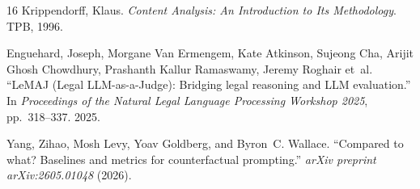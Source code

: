 \begin{thebibliography}{16}
Krippendorff, Klaus. \emph{Content Analysis: An Introduction to Its
Methodology}. TPB, 1996.

Enguehard, Joseph, Morgane Van Ermengem, Kate Atkinson, Sujeong Cha, Arijit
Ghosh Chowdhury, Prashanth Kallur Ramaswamy, Jeremy Roghair et~al. ``LeMAJ
(Legal LLM-as-a-Judge): Bridging legal reasoning and LLM evaluation.'' In
\emph{Proceedings of the Natural Legal Language Processing Workshop 2025},
pp.~318--337. 2025.

Yang, Zihao, Mosh Levy, Yoav Goldberg, and Byron~C. Wallace. ``Compared to what?
Baselines and metrics for counterfactual prompting.'' \emph{arXiv preprint
arXiv:2605.01048} (2026).

\end{thebibliography}
